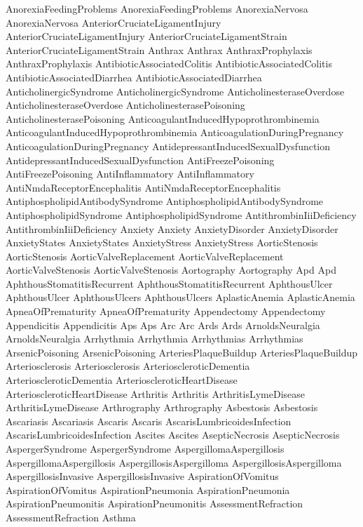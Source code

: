  AnorexiaFeedingProblems
 AnorexiaFeedingProblems
 AnorexiaNervosa
 AnorexiaNervosa
 AnteriorCruciateLigamentInjury
 AnteriorCruciateLigamentInjury
 AnteriorCruciateLigamentStrain
 AnteriorCruciateLigamentStrain
 Anthrax
 Anthrax
 AnthraxProphylaxis
 AnthraxProphylaxis
 AntibioticAssociatedColitis
 AntibioticAssociatedColitis
 AntibioticAssociatedDiarrhea
 AntibioticAssociatedDiarrhea
 AnticholinergicSyndrome
 AnticholinergicSyndrome
 AnticholinesteraseOverdose
 AnticholinesteraseOverdose
 AnticholinesterasePoisoning
 AnticholinesterasePoisoning
 AnticoagulantInducedHypoprothrombinemia
 AnticoagulantInducedHypoprothrombinemia
 AnticoagulationDuringPregnancy
 AnticoagulationDuringPregnancy
 AntidepressantInducedSexualDysfunction
 AntidepressantInducedSexualDysfunction
 AntiFreezePoisoning
 AntiFreezePoisoning
 AntiInflammatory
 AntiInflammatory
 AntiNmdaReceptorEncephalitis
 AntiNmdaReceptorEncephalitis
 AntiphospholipidAntibodySyndrome
 AntiphospholipidAntibodySyndrome
 AntiphospholipidSyndrome
 AntiphospholipidSyndrome
 AntithrombinIiiDeficiency
 AntithrombinIiiDeficiency
 Anxiety
 Anxiety
 AnxietyDisorder
 AnxietyDisorder
 AnxietyStates
 AnxietyStates
 AnxietyStress
 AnxietyStress
 AorticStenosis
 AorticStenosis
 AorticValveReplacement
 AorticValveReplacement
 AorticValveStenosis
 AorticValveStenosis
 Aortography
 Aortography
 Apd
 Apd
 AphthousStomatitisRecurrent
 AphthousStomatitisRecurrent
 AphthousUlcer
 AphthousUlcer
 AphthousUlcers
 AphthousUlcers
 AplasticAnemia
 AplasticAnemia
 ApneaOfPrematurity
 ApneaOfPrematurity
 Appendectomy
 Appendectomy
 Appendicitis
 Appendicitis
 Aps
 Aps
 Arc
 Arc
 Ards
 Ards
 ArnoldsNeuralgia
 ArnoldsNeuralgia
 Arrhythmia
 Arrhythmia
 Arrhythmias
 Arrhythmias
 ArsenicPoisoning
 ArsenicPoisoning
 ArteriesPlaqueBuildup
 ArteriesPlaqueBuildup
 Arteriosclerosis
 Arteriosclerosis
 ArterioscleroticDementia
 ArterioscleroticDementia
 ArterioscleroticHeartDisease
 ArterioscleroticHeartDisease
 Arthritis
 Arthritis
 ArthritisLymeDisease
 ArthritisLymeDisease
 Arthrography
 Arthrography
 Asbestosis
 Asbestosis
 Ascariasis
 Ascariasis
 Ascaris
 Ascaris
 AscarisLumbricoidesInfection
 AscarisLumbricoidesInfection
 Ascites
 Ascites
 AsepticNecrosis
 AsepticNecrosis
 AspergerSyndrome
 AspergerSyndrome
 AspergillomaAspergillosis
 AspergillomaAspergillosis
 AspergillosisAspergilloma
 AspergillosisAspergilloma
 AspergillosisInvasive
 AspergillosisInvasive
 AspirationOfVomitus
 AspirationOfVomitus
 AspirationPneumonia
 AspirationPneumonia
 AspirationPneumonitis
 AspirationPneumonitis
 AssessmentRefraction
 AssessmentRefraction
 Asthma
